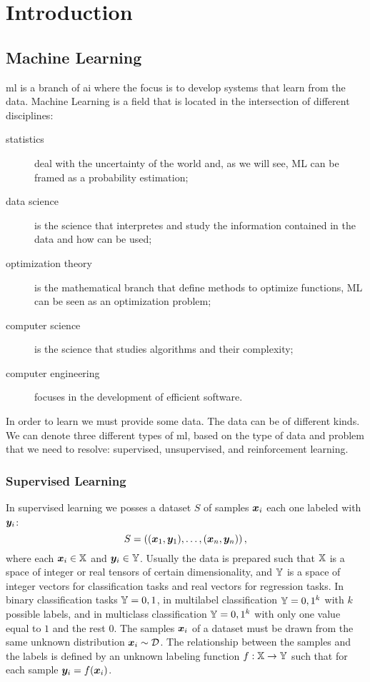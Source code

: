 \chapter{Introduction}
\label{ch:introduction}

\section{Machine Learning}
\ac{ml} is a branch of \ac{ai}
where the focus is to develop systems that learn from the
data. Machine Learning is a field that is located in the intersection
of different disciplines:
\begin{description}
\item[statistics] deal with the uncertainty of the world and, as we
  will see, ML can be framed as a probability estimation;
\item[data science] is the science that interpretes and study the
  information contained in the data and how can be used;
\item[optimization theory] is the mathematical branch that define
  methods to optimize functions, ML can be seen as an optimization
  problem;
\item[computer science] is the science that studies algorithms and
  their complexity;
\item[computer engineering] focuses in the development of efficient
  software.
\end{description}

In order to learn we must provide some data. The data can be of
different kinds. We can denote three different types of \ac{ml}, based
on the type of data and problem that we need to resolve: supervised,
unsupervised, and reinforcement learning.

\subsection{Supervised Learning}
In supervised learning we posses a dataset $S$ of samples $\bm{x}_i$
each one labeled with $\bm{y}_i$:
\begin{equation*}
  S=\left((\bm{x}_1,\bm{y}_1),\dots,(\bm{x}_n,\bm{y}_n)\right),
\end{equation*}
where each $\bm{x}_i\in\mathbb{X}$ and $\bm{y}_i\in\mathbb{Y}$. Usually the
data is prepared such that $\mathbb{X}$ is a space of integer or real
tensors of certain dimensionality, and $\mathbb{Y}$ is a space of integer
vectors for classification tasks and real vectors for regression
tasks. In binary classification tasks $\mathbb{Y}={0,1}$, in multilabel
classification $\mathbb{Y}={0,1}^k$ with $k$ possible labels, and in
multiclass classification $\mathbb{Y}={0,1}^k$ with only one value equal to
$1$ and the rest $0$. The samples $\bm{x}_i$ of a dataset must be
drawn from the same unknown distribution $\bm{x}_i\sim\mathcal{D}$. The
relationship between the samples and the labels is defined by an unknown
labeling function $f:\mathbb{X}\rightarrow\mathbb{Y}$ such that for each sample
$\bm{y}_i=f(\bm{x}_i)$.


